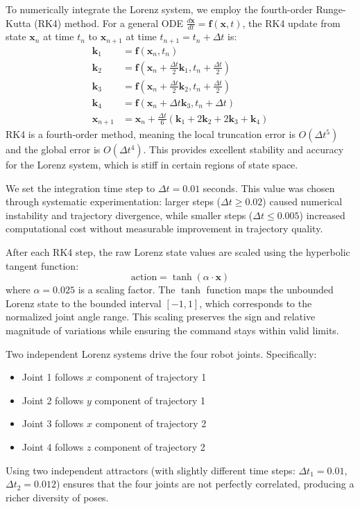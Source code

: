 \documentclass[12pt,a4paper,oneside]{report}
\begin{document}
To numerically integrate the Lorenz system, we employ the fourth-order Runge-Kutta (RK4) method. For a general ODE $\frac{d\mathbf{x}}{dt} = \mathbf{f}(\mathbf{x}, t)$, the RK4 update from state $\mathbf{x}_n$ at time $t_n$ to $\mathbf{x}_{n+1}$ at time $t_{n+1} = t_n + \Delta t$ is:
\begin{align}
\mathbf{k}_1 &= \mathbf{f}(\mathbf{x}_n, t_n) \\
\mathbf{k}_2 &= \mathbf{f}(\mathbf{x}_n + \frac{\Delta t}{2}\mathbf{k}_1, t_n + \frac{\Delta t}{2}) \\
\mathbf{k}_3 &= \mathbf{f}(\mathbf{x}_n + \frac{\Delta t}{2}\mathbf{k}_2, t_n + \frac{\Delta t}{2}) \\
\mathbf{k}_4 &= \mathbf{f}(\mathbf{x}_n + \Delta t \mathbf{k}_3, t_n + \Delta t) \\
\mathbf{x}_{n+1} &= \mathbf{x}_n + \frac{\Delta t}{6}(\mathbf{k}_1 + 2\mathbf{k}_2 + 2\mathbf{k}_3 + \mathbf{k}_4)
\end{align}
RK4 is a fourth-order method, meaning the local truncation error is $O(\Delta t^5)$ and the global error is $O(\Delta t^4)$. This provides excellent stability and accuracy for the Lorenz system, which is stiff in certain regions of state space.

We set the integration time step to $\Delta t = 0.01$ seconds. This value was chosen through systematic experimentation: larger steps ($\Delta t \geq 0.02$) caused numerical instability and trajectory divergence, while smaller steps ($\Delta t \leq 0.005$) increased computational cost without measurable improvement in trajectory quality.

After each RK4 step, the raw Lorenz state values are scaled using the hyperbolic tangent function:
\begin{equation}
\text{action} = \tanh(\alpha \cdot \mathbf{x})
\end{equation}
where $\alpha = 0.025$ is a scaling factor. The $\tanh$ function maps the unbounded Lorenz state to the bounded interval $[-1, 1]$, which corresponds to the normalized joint angle range. This scaling preserves the sign and relative magnitude of variations while ensuring the command stays within valid limits.

Two independent Lorenz systems drive the four robot joints. Specifically:
\begin{itemize}
    \item Joint 1 follows $x$ component of trajectory 1
    \item Joint 2 follows $y$ component of trajectory 1
    \item Joint 3 follows $x$ component of trajectory 2
    \item Joint 4 follows $z$ component of trajectory 2
\end{itemize}
Using two independent attractors (with slightly different time steps: $\Delta t_1 = 0.01$, $\Delta t_2 = 0.012$) ensures that the four joints are not perfectly correlated, producing a richer diversity of poses.
\end{document}
